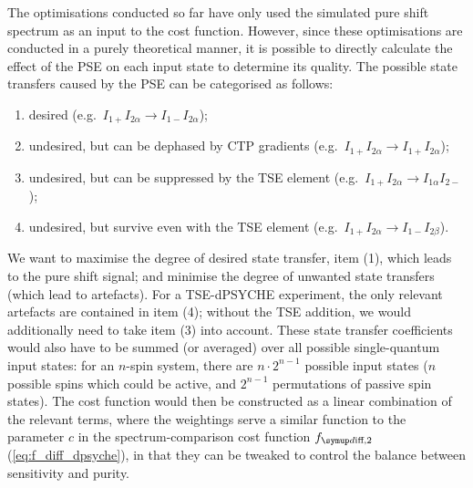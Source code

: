 The optimisations conducted so far have only used the simulated pure shift spectrum as an input to the cost function.
However, since these optimisations are conducted in a purely theoretical manner, it is possible to directly calculate the effect of the PSE on each input state to determine its quality.
The possible state transfers caused by the PSE can be categorised as follows:
\begin{enumerate}
    \item desired (e.g.\ $I_{1+}I_{2\alpha} \to I_{1-}I_{2\alpha}$);
    \item undesired, but can be dephased by CTP gradients (e.g.\ $I_{1+}I_{2\alpha} \to I_{1+}I_{2\alpha}$);
    \item undesired, but can be suppressed by the TSE element (e.g.\ $I_{1+}I_{2\alpha} \to I_{1\alpha}I_{2-}$);
    \item undesired, but survive even with the TSE element (e.g.\ $I_{1+}I_{2\alpha} \to I_{1-}I_{2\beta}$).
\end{enumerate}
We want to maximise the degree of desired state transfer, item (1), which leads to the pure shift signal; and minimise the degree of unwanted state transfers (which lead to artefacts).
For a TSE-dPSYCHE experiment, the only relevant artefacts are contained in item (4); without the TSE addition, we would additionally need to take item (3) into account.
These state transfer coefficients would also have to be summed (or averaged) over all possible single-quantum input states: for an $n$-spin system, there are $n \cdot 2^{n-1}$ possible input states ($n$ possible spins which could be active, and $2^{n-1}$ permutations of passive spin states).
The cost function would then be constructed as a linear combination of the relevant terms, where the weightings serve a similar function to the parameter $c$ in the spectrum-comparison cost function $\fdifftwo$ (\cref{eq:f_diff_dpsyche}), in that they can be tweaked to control the balance between sensitivity and purity.


